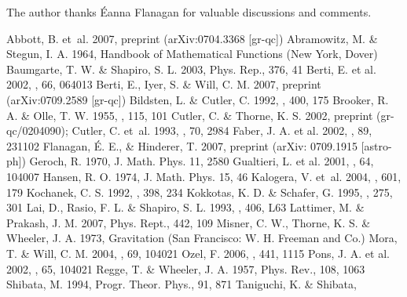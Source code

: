 \documentclass[12pt,preprint]{aastex}
\begin{document}
{\acknowledgments

The author thanks \'Eanna Flanagan for valuable discussions and
comments.


\clearpage

\begin{thebibliography}{}
Abbott, B. et~al. 2007, preprint (arXiv:0704.3368 [gr-qc])
 Abramowitz, M. \&
Stegun, I. A. 1964, { Handbook of Mathematical Functions} (New York,
Dover)
{Baumgarte}, T. W. \& {Shapiro}, S. L. 2003, Phys. Rep., 376, 41
 Berti, E.  et al. 2002, \prd, 66, 064013
 Berti, E., Iyer, S. \& Will, C.
M. 2007, preprint (arXiv:0709.2589 [gr-qc])
 Bildsten, L. \& Cutler, C. 1992, \apj, 400, 175
 Brooker, R. A. \&  Olle, T. W. 1955,
\mnras, 115, 101
Cutler, C. \& Thorne, K. S. 2002, preprint (gr-qc/0204090);
{Cutler}, C. et~al. 1993, \prl, 70, 2984
 Faber, J. A. et al. 2002,
\prl, 89, 231102
 Flanagan, \'E. E., \&  Hinderer, T. 2007,  preprint
 (arXiv: 0709.1915 [astro-ph])
 Geroch, R. 1970, J. Math. Phys. 11, 2580
 Gualtieri, L. et al. 2001, \prd, 64, 104007
 Hansen, R. O. 1974, J. Math. Phys. 15, 46
{Kalogera}, V. et~al. 2004, \apj,  601, 179
 Kochanek, C. S. 1992, \apj, 398, 234
 Kokkotas, K. D. \&  Schafer, G. 1995, \mnras, 275,
301
 Lai, D., Rasio, F. L. \&  Shapiro, S. L. 1993, \apjl, 406,
L63
 Lattimer, M. \& Prakash, J. M.  2007, Phys. Rept.,
442, 109
 Misner, C. W., Thorne, K. S. \&  Wheeler, J. A. 1973,
{Gravitation} (San Francisco: W. H. Freeman and Co.)
 Mora, T. \& Will, C. M. 2004, \prd, 69, 104021
 Ozel, F. 2006, \nat, 441, 1115
 Pons, J. A. et al. 2002, \prd, 65, 104021
 Regge, T. \&  Wheeler, J. A. 1957, Phys. Rev., 108, 1063
 Shibata, M. 1994, Progr. Theor. Phys., 91, 871
 Taniguchi, K. \& Shibata,

\end{thebibliography}}
\end{document}
